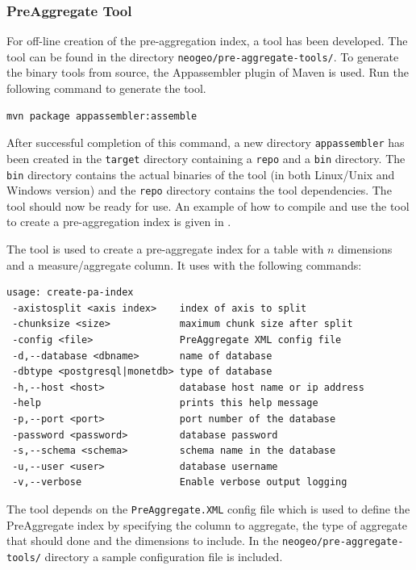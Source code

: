 \subsubsection{PreAggregate Tool}
\label{sec:preaggtool}

For off-line creation of the pre-aggregation index, a tool has been
developed. The tool can be found in the directory
\lstinline|neogeo/pre-aggregate-tools/|. To generate the binary tools from
source, the Appassembler plugin of Maven is used. Run the following command
to generate the tool.

\begin{lstlisting}
mvn package appassembler:assemble
\end{lstlisting}

After successful completion of this command, a new directory
\lstinline|appassembler| has been created in the \lstinline|target|
directory containing a \lstinline|repo| and a \lstinline|bin| directory.
The \lstinline|bin| directory contains the actual binaries of the tool (in
both Linux/Unix and Windows version) and the \lstinline|repo| directory
contains the tool dependencies. The tool should now be ready for use. An
example of how to compile and use the tool to create a pre-aggregation
index is given in .

The tool is used to create a pre-aggregate index for a table with
$\textit{n}$ dimensions and a measure/aggregate column. It uses with the
following commands:
\begin{lstlisting}[basicstyle=\small]
usage: create-pa-index
 -axistosplit <axis index>    index of axis to split
 -chunksize <size>            maximum chunk size after split
 -config <file>               PreAggregate XML config file
 -d,--database <dbname>       name of database
 -dbtype <postgresql|monetdb> type of database
 -h,--host <host>             database host name or ip address
 -help                        prints this help message
 -p,--port <port>             port number of the database
 -password <password>         database password
 -s,--schema <schema>         schema name in the database
 -u,--user <user>             database username
 -v,--verbose                 Enable verbose output logging
\end{lstlisting}
The tool depends on the \lstinline|PreAggregate.XML| config file which
is used to define the PreAggregate index by specifying the column to
aggregate, the type of aggregate that should done and the dimensions to
include. In the \lstinline|neogeo/pre-aggregate-tools/| directory a sample
configuration file is included.


